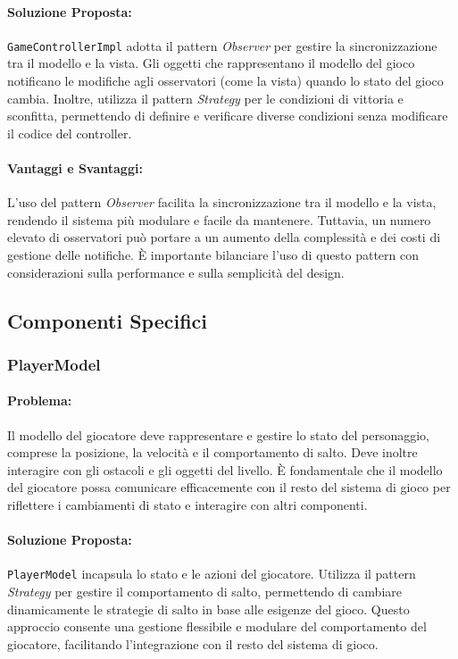 \documentclass[a4paper,12pt]{report}
\begin{document}
	\paragraph{Soluzione Proposta:} \texttt{GameControllerImpl} adotta il pattern \textit{Observer} per gestire la sincronizzazione tra il modello e la vista. Gli oggetti che rappresentano il modello del gioco notificano le modifiche agli osservatori (come la vista) quando lo stato del gioco cambia. Inoltre, utilizza il pattern \textit{Strategy} per le condizioni di vittoria e sconfitta, permettendo di definire e verificare diverse condizioni senza modificare il codice del controller.
	
	\paragraph{Vantaggi e Svantaggi:} 
	L'uso del pattern \textit{Observer} facilita la sincronizzazione tra il modello e la vista, rendendo il sistema più modulare e facile da mantenere. Tuttavia, un numero elevato di osservatori può portare a un aumento della complessità e dei costi di gestione delle notifiche. È importante bilanciare l'uso di questo pattern con considerazioni sulla performance e sulla semplicità del design.
	
	\subsection{Componenti Specifici}
	
	\subsubsection{PlayerModel}
	
	\paragraph{Problema:} Il modello del giocatore deve rappresentare e gestire lo stato del personaggio, comprese la posizione, la velocità e il comportamento di salto. Deve inoltre interagire con gli ostacoli e gli oggetti del livello. È fondamentale che il modello del giocatore possa comunicare efficacemente con il resto del sistema di gioco per riflettere i cambiamenti di stato e interagire con altri componenti.
	
	\paragraph{Soluzione Proposta:} \texttt{PlayerModel} incapsula lo stato e le azioni del giocatore. Utilizza il pattern \textit{Strategy} per gestire il comportamento di salto, permettendo di cambiare dinamicamente le strategie di salto in base alle esigenze del gioco. Questo approccio consente una gestione flessibile e modulare del comportamento del giocatore, facilitando l'integrazione con il resto del sistema di gioco.
	
\end{document}

